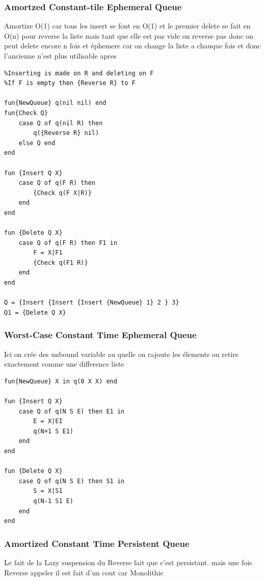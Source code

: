 \documentclass[a4paper,12pt]{scrartcl}
\begin{document}
		\subsubsection{Amortzed Constant-tile Ephemeral Queue}
		Amortize O(1) car tous les insert se font en O(1) et le premier delete se fait en O(n) pour reverse la liste mais tant que elle est pas vide on reverse pas donc on peut delete encore n fois
		et éphemere car on change la liste a chauque fois et donc l'ancienne n'est plus utilisable apres
			\begin{lstlisting}[language=OZ]
%Queue represented as a tuple q(F R)  where element of the liste is {Append F {Reverse R}}
%Inserting is made on R and deleting on F
%If F is empty then {Reverse R} to F

fun{NewQueue} q(nil nil) end
fun{Check Q}
	case Q of q(nil R) then
		q({Reverse R} nil)
	else Q end
end

fun {Insert Q X}
	case Q of q(F R) then
		{Check q(F X|R)}
	end
end

fun {Delete Q X}
	case Q of q(F R) then F1 in
		F = X|F1
		{Check q(F1 R)}
	end
end

Q = {Insert {Insert {Insert {NewQueue} 1} 2 } 3}
Q1 = {Delete Q X}
			\end{lstlisting}
			
		\subsubsection{Worst-Case Constant Time Ephemeral Queue}
			Ici on crée des unbound variable au quelle on rajoute les élements ou retire
		exactement comme une difference liste
			
	
			\begin{lstlisting}[language=OZ]
%Queue represented as q(N S E) N the size and (S, E) a difference list, inserting by updating E et remove by updating S
fun{NewQueue} X in q(0 X X) end

fun {Insert Q X}
	case Q of q(N S E) then E1 in
		E = X|EI
		q(N+1 S E1)
	end
end

fun {Delete Q X}
	case Q of q(N S E) then S1 in
		S = X|S1
		q(N-1 S1 E)
	end
end
			\end{lstlisting}
			
		\subsubsection{Amortized Constant Time Persistent Queue}
			Le fait de la Lazy suspension du Reverse fait que c'est persistant. mais une fois Reverse appeler il est fait d'un cout car Monolithic
			
\end{document}
